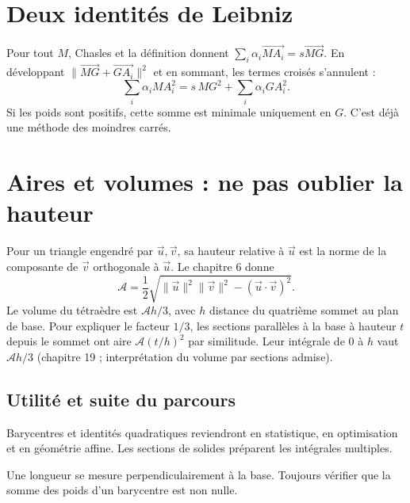 \documentclass[../cours_tle.tex]{subfiles}
\begin{document}
\section{Deux identités de Leibniz}
Pour tout $M$, Chasles et la définition donnent
$\sum_i\alpha_i\overrightarrow{MA_i}=s\overrightarrow{MG}$.
En développant $\|\overrightarrow{MG}+\overrightarrow{GA_i}\|^2$ et en sommant, les termes croisés s'annulent :
\[
\sum_i\alpha_i MA_i^2=s\,MG^2+\sum_i\alpha_i GA_i^2.
\]
Si les poids sont positifs, cette somme est minimale uniquement en $G$.
C'est déjà une méthode des moindres carrés.
\section{Aires et volumes : ne pas oublier la hauteur}
Pour un triangle engendré par $\vec u,\vec v$, sa hauteur relative à $\vec u$ est la norme de la composante de $\vec v$ orthogonale à $\vec u$. Le chapitre 6 donne
\[
\mathcal A=\frac12\sqrt{\|\vec u\|^2\|\vec v\|^2-(\vec u\cdot\vec v)^2}.
\]
Le volume du tétraèdre est $\mathcal A h/3$, avec $h$ distance du quatrième sommet au plan de base. Pour expliquer le facteur $1/3$, les sections parallèles à la base à hauteur $t$ depuis le sommet ont aire $\mathcal A(t/h)^2$ par similitude. Leur intégrale de $0$ à $h$ vaut $\mathcal A h/3$ (chapitre 19 ; interprétation du volume par sections admise).
\begin{finchapitre}
\section{Utilité et suite du parcours}
Barycentres et identités quadratiques reviendront en statistique, en optimisation et en géométrie affine. Les sections de solides préparent les intégrales multiples.
\begin{retenir}
Une longueur se mesure perpendiculairement à la base. Toujours vérifier que la somme des poids d'un barycentre est non nulle.
\end{retenir}
\end{finchapitre}
\end{document}
